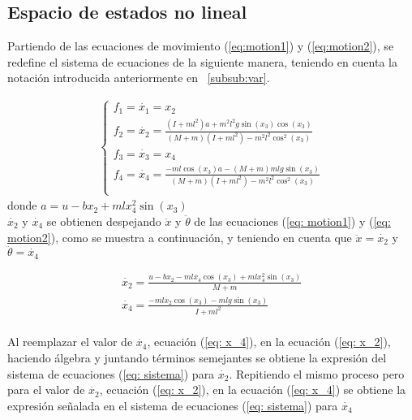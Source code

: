 \documentclass{ieeeaccess}
\begin{document}
\subsection{Espacio de estados no lineal}
Partiendo de las ecuaciones de movimiento (\ref{eq:motion1}) y
(\ref{eq:motion2}), se redefine el sistema de ecuaciones de la siguiente
manera, teniendo en cuenta la notación introducida anteriormente en
~\ref{subsub:var}.

\begin{eqnarray}
  \label{eq:sistema}
  \left\{
  \begin{array}{ll}
    f_1 = \displaystyle\dot{x_1} = \displaystyle x_2 \\
    f_2 = \displaystyle\dot{x_2} =
            \displaystyle\frac{(I + ml^2)a + m^2l^2g\sin(x_3)\cos(x_3)}
              {(M + m)(I + ml^2)-m^2l^2\cos^2(x_3)}\\
    f_3 = \displaystyle\dot{x_3} = \displaystyle x_4\\
    f_4 = \dot{x_4} = \displaystyle\frac{-ml\cos(x_3)a - (M + m)mlg\sin(x_3)}
                         {(M + m)(I + ml^2) - m^2l^2\cos^2(x_3)}\\
  \end{array}
  \right.
\end{eqnarray}
donde $a = u-bx_2+mlx_4^2\sin(x_3)$\\

$\dot{x_2}$ y $\dot{x_4}$ se obtienen despejando $\ddot{x}$ y $\ddot{\theta}$ de
las ecuaciones (\ref{eq: motion1}) y (\ref{eq: motion2}), como se muestra a
continuación, y teniendo en cuenta que $\ddot{x}=\dot{x_2}$ y
$\ddot{\theta}=\dot{x_4}$

\begin{eqnarray}
  \label{eq: x_2}
  \dot{x_2} = \displaystyle\frac{u - bx_2 - ml\dot{x_4}\cos(x_3)
    + mlx_4^2\sin(x_3)}{M+m}\\
  \label{eq: x_4}
  \dot{x_4} = \displaystyle\frac{-ml\dot{x_2}\cos(x_3) - mlg\sin(x_3)}{I + ml^2}
\end{eqnarray}\\

Al reemplazar el valor de $\dot{x_4}$, ecuación (\ref{eq: x_4}), en la ecuación
(\ref{eq: x_2}), haciendo álgebra y juntando términos semejantes se obtiene la
expresión del sistema de ecuaciones (\ref{eq: sistema}) para $\dot{x_2}$.
Repitiendo el mismo proceso pero para el valor de $\dot{x_2}$, ecuación
(\ref{eq: x_2}), en la ecuación (\ref{eq: x_4}) se obtiene la expresión
señalada en el sistema de ecuaciones (\ref{eq: sistema}) para $\dot{x_4}$
\end{document}
